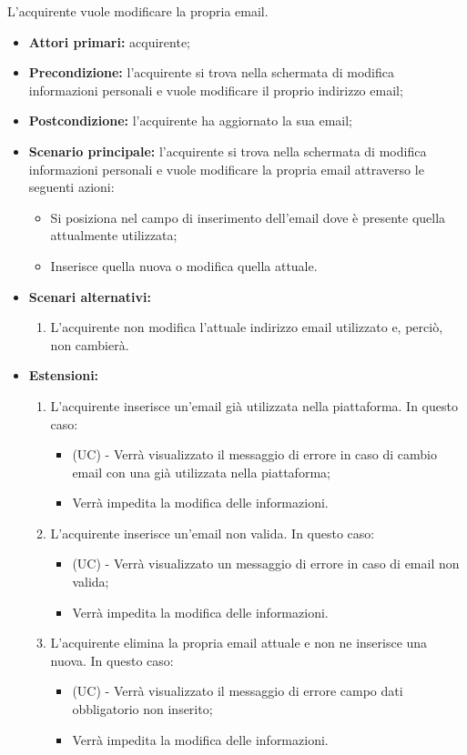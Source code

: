 L'acquirente vuole modificare la propria email.
\begin{itemize}
    \item \textbf{Attori primari:} acquirente;
    \item \textbf{Precondizione:} l'acquirente si trova nella schermata di modifica informazioni personali e vuole modificare il proprio indirizzo email;
    \item \textbf{Postcondizione:} l'acquirente ha aggiornato la sua email;
    \item \textbf{Scenario principale:} l'acquirente si trova nella schermata di modifica informazioni personali e vuole modificare la propria email attraverso le seguenti azioni:
        \begin{itemize}
            \item Si posiziona nel campo di inserimento dell'email dove è presente quella attualmente utilizzata;
            \item Inserisce quella nuova o modifica quella attuale.
        \end{itemize}
    \item \textbf{Scenari alternativi:} 
    \begin{enumerate}[label=\lett]
        \item L'acquirente non modifica l'attuale indirizzo email utilizzato e, perciò, non cambierà.
    \end{enumerate}
    \item \textbf{Estensioni:} 
    \begin{enumerate}[label=\lett]
        \item L'acquirente inserisce un'email già utilizzata nella piattaforma. In questo caso:
        \begin{itemize}
            \item (UC) - Verrà visualizzato il messaggio di errore in caso di cambio email con una già utilizzata nella piattaforma;
            \item Verrà impedita la modifica delle informazioni.
        \end{itemize}
        \item L'acquirente inserisce un'email non valida. In questo caso:
        \begin{itemize}
            \item (UC) - Verrà visualizzato un messaggio di errore in caso di email non valida;
            \item Verrà impedita la modifica delle informazioni.
        \end{itemize}
        \item L'acquirente elimina la propria email attuale e non ne inserisce una nuova. In questo caso:
        \begin{itemize}
            \item (UC) - Verrà visualizzato il messaggio di errore campo dati obbligatorio non inserito;
            \item Verrà impedita la modifica delle informazioni.
        \end{itemize}
    \end{enumerate}
\end{itemize}

